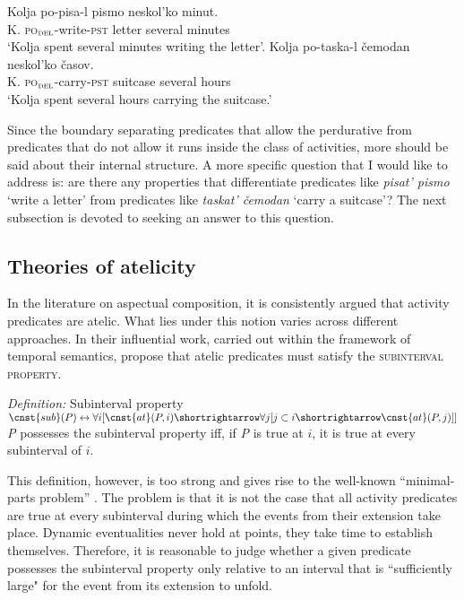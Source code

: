 \documentclass[output=paper,
]{langscibook}
\begin{document}
\ea \label{ex:naumov:24} \ea \label{ex:naumov:24a}
\gll  Kolja	po-pisa-l		pismo		neskol’ko	minut.\\
K. \textsc{po}$_\textsc{del}$-write-\textsc{pst}   letter		several		minutes    \\      
\glt `Kolja spent several minutes writing the letter'.
\ex \label{ex:naumov:24b}
\gll Kolja	po-taska-l		čemodan	neskol’ko	časov. \\
K. \textsc{po}$_\textsc{del}$-carry-\textsc{pst} suitcase	several		hours \\
\glt `Kolja spent several hours carrying the suitcase.'
\z \z

\noindent Since the boundary separating predicates that allow the perdurative from predicates that do not allow it runs inside the class of activities, more should be said about their internal structure. A more specific question that I would like to address is: are there any properties that differentiate predicates like \textit{pisat’ pismo} `write a letter’ from predicates like \textit{taskat’ čemodan} `carry a suitcase’? The next subsection is devoted to seeking an answer to this question.

\subsection{Theories of atelicity} \label{sec:naumov:3.4}

In the literature on aspectual composition, it is consistently argued that activity predicates are atelic. What lies under this notion varies across different approaches. In their influential work, carried out within the framework of temporal semantics, \citet{bennett1978toward} propose that atelic predicates must satisfy the \textsc{subinterval property}.

\ea \label{ex:naumov:25}
\textit{Definition:} Subinterval property\smallskip\\
$\cnst{sub}(P) \leftrightarrow \forall i [\cnst{at}(P, i) \shortrightarrow \forall j[j \subset i \shortrightarrow \cnst{at}(P, j)]]$ \\
\textit{P} possesses the subinterval property iff, if \textit{P} is true at $i$, it is true at every subinterval of $i$.
\z

\noindent This definition, however, is too strong and gives rise to the well-known ``minimal-parts problem'' \citep{dowty1979word}. The problem is that it is not the case that all activity predicates are true at every subinterval during which the events from their extension take place. Dynamic eventualities never hold at points, they take time to establish themselves. Therefore, it is reasonable to judge whether a given predicate possesses the subinterval property only relative to an interval that is ``sufficiently large" for the event from its extension to unfold.
\end{document}
